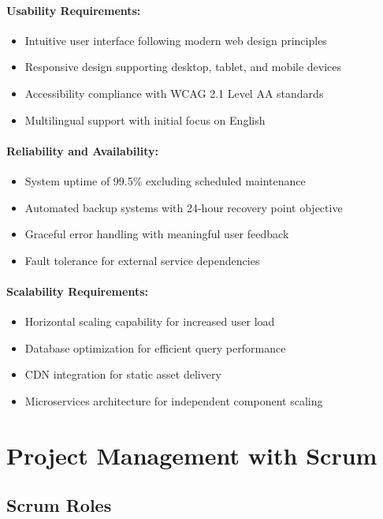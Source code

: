 \paragraph{Usability Requirements:}
\begin{itemize}
    \item Intuitive user interface following modern web design principles
    \item Responsive design supporting desktop, tablet, and mobile devices
    \item Accessibility compliance with WCAG 2.1 Level AA standards
    \item Multilingual support with initial focus on English
\end{itemize}

\paragraph{Reliability and Availability:}
\begin{itemize}
    \item System uptime of 99.5\% excluding scheduled maintenance
    \item Automated backup systems with 24-hour recovery point objective
    \item Graceful error handling with meaningful user feedback
    \item Fault tolerance for external service dependencies
\end{itemize}

\paragraph{Scalability Requirements:}
\begin{itemize}
    \item Horizontal scaling capability for increased user load
    \item Database optimization for efficient query performance
    \item CDN integration for static asset delivery
    \item Microservices architecture for independent component scaling
\end{itemize}

\section{Project Management with Scrum}

\subsection{Scrum Roles}

